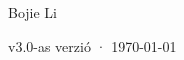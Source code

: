 \begin{titlepage}
\vfill
{\LARGE\sffamily Bojie Li\par}
\vspace{0.7cm}
{\small\sffamily\color{structurecolor!80} v3.0-as verzió · \today\par}
\vspace{1.2cm}
\end{titlepage}
